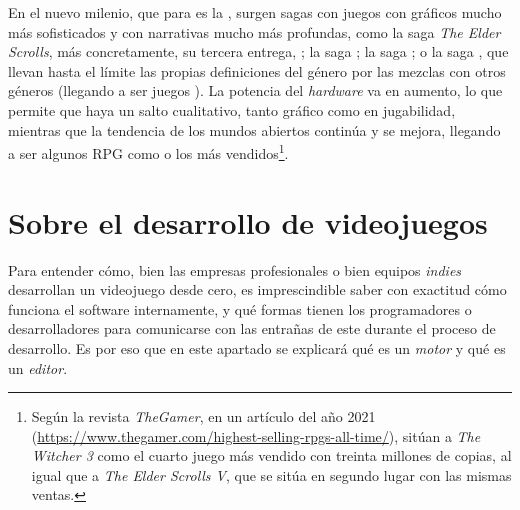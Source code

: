En el nuevo milenio, que para \citeauthor{barton2008dungeons} es la , surgen sagas con juegos con gráficos mucho más sofisticados y con narrativas mucho más profundas, como la saga \textit{The Elder Scrolls}, más concretamente, su tercera entrega, ; la saga ; la saga ; o la saga , que llevan hasta el límite las propias definiciones del género por las mezclas con otros géneros (llegando a ser juegos ). La potencia del \textit{hardware} va en aumento, lo que permite que haya un salto cualitativo, tanto gráfico como en jugabilidad, mientras que la tendencia de los mundos abiertos continúa y se mejora, llegando a ser algunos RPG como  o  los más vendidos\footnote{Según la revista \textit{TheGamer}, en un artículo del año 2021 (\url{https://www.thegamer.com/highest-selling-rpgs-all-time/}), sitúan a \textit{The Witcher 3} como el cuarto juego más vendido con treinta millones de copias, al igual que a \textit{The Elder Scrolls V}, que se sitúa en segundo lugar con las mismas ventas.}.

\section{Sobre el desarrollo de videojuegos}
Para entender cómo, bien las empresas profesionales o bien equipos \textit{indies} desarrollan un videojuego desde cero, es imprescindible saber con exactitud cómo funciona el software internamente, y qué formas tienen los programadores o desarrolladores para comunicarse con las entrañas de este durante el proceso de desarrollo. Es por eso que en este apartado se explicará qué es un \textit{motor} y qué es un \textit{editor}.


